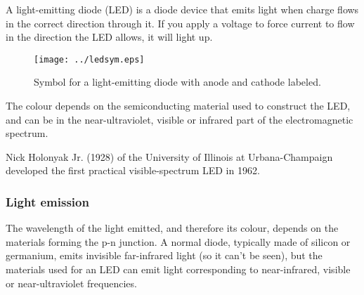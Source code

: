 A light-emitting diode (LED) is a diode device that emits light when charge flows in the correct direction through it. If you apply a voltage to force current to flow in the direction the LED allows, it will light up.

\begin{figure}[H]
\begin{center}
\texttt{[image: ../ledsym.eps]}
\caption{Symbol for a light-emitting diode with anode and cathode labeled.}
\end{center}
\end{figure}


The colour depends on the semiconducting material used to construct the LED, and can be in the near-ultraviolet, visible or infrared part of the electromagnetic spectrum.
 
\begin{IFact}{Nick Holonyak Jr. (1928) of the University of Illinois at Urbana-Champaign developed the first practical visible-spectrum LED in 1962.}
\end{IFact}

\subsubsection{Light emission}
The wavelength of the light emitted, and therefore its colour, depends on the materials forming the p-n junction. A normal diode, typically made of silicon or germanium, emits invisible far-infrared light (so it can't be seen), but the materials used for an LED can emit light corresponding to near-infrared, visible or near-ultraviolet frequencies.

